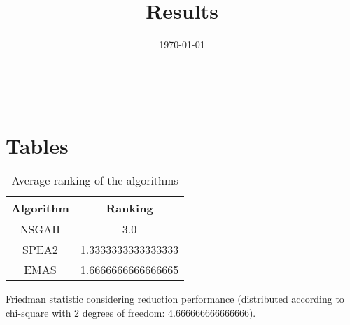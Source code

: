 \documentclass{article}
\title{Results}
\author{}
\date{\today}
\begin{document}
\oddsidemargin 0in \topmargin 0in\maketitle
\
\section{Tables}
\begin{table}[!htp]
\centering
\caption{Average ranking of the algorithms}
\begin{tabular}{c|c}
Algorithm&Ranking\\
\hline
NSGAII&3.0\\
SPEA2&1.3333333333333333\\
EMAS&1.6666666666666665\\
\end{tabular}
\end{table}


Friedman statistic considering reduction performance (distributed according to chi-square with 2 degrees of freedom: 4.666666666666666).
\end{document}
